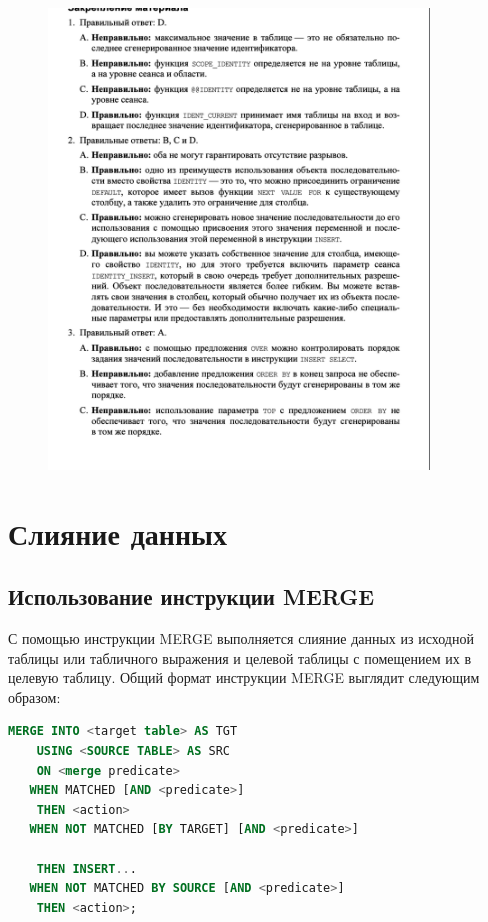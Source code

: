 \begin{figure}[h!]
	\begin{center}
		\includegraphics[width=0.9\textwidth]{img/ans25.png}
	\end{center}
	\captionsetup{justification=centering}
\end{figure}
\clearpage


\section{Слияние данных}

\subsection{Использование инструкции MERGE}

С помощью инструкции MERGE выполняется слияние данных из исходной таблицы
или табличного выражения и целевой таблицы с помещением их в целевую таблицу. Общий формат инструкции MERGE выглядит следующим образом: 

\begin{lstlisting}[label=lst:funcReturn, language=sql]
	MERGE INTO <target table> AS TGT
	USING <SOURCE TABLE> AS SRC
	ON <merge predicate>
   WHEN MATCHED [AND <predicate>] 
	THEN <action> 
   WHEN NOT MATCHED [BY TARGET] [AND <predicate>] 
	
	THEN INSERT...
   WHEN NOT MATCHED BY SOURCE [AND <predicate>] 
	THEN <action>; 
\end{lstlisting}

